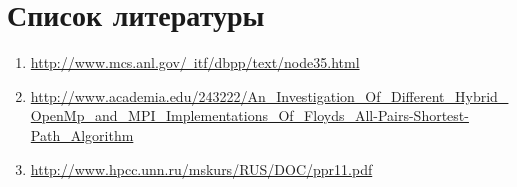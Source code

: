 \documentclass[a4paper,12pt]{report}
\begin{document}
\section*{Список литературы}
\begin{enumerate}
\item
\href{http://www.mcs.anl.gov/~itf/dbpp/text/node35.html}{http://www.mcs.anl.gov/~itf/dbpp/text/node35.html}\\
\item
\href{http://www.academia.edu/243222/An\_Investigation\_Of\_Different\_Hybrid\_OpenMp\_and\_MPI\_Implementations\_Of\_Floyds\_All-Pairs-Shortest-Path\_Algorithm}{http://www.academia.edu/243222/An\_Investigation\_Of\_Different\_Hybrid\_OpenMp\_and\_MPI\_Implementations\_Of\_Floyds\_All-Pairs-Shortest-Path\_Algorithm}\\
\item
\href{http://www.hpcc.unn.ru/mskurs/RUS/DOC/ppr11.pdf}{http://www.hpcc.unn.ru/mskurs/RUS/DOC/ppr11.pdf}\\
\end{enumerate}
\end{document}
